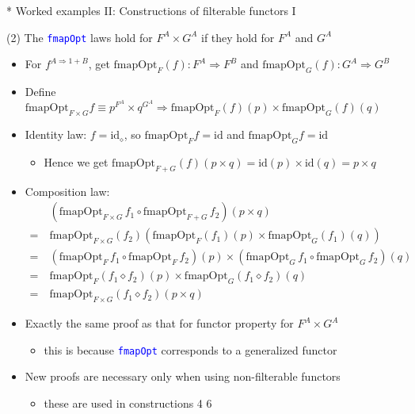 \documentclass[english]{beamer}
\begin{document}
\begin{frame}{{*} Worked examples II: Constructions of filterable functors I}

(2) The \texttt{\textcolor{blue}{\footnotesize{}fmapOpt}} laws hold
for $F^{A}\times G^{A}$ if they hold for $F^{A}$ and $G^{A}$
\begin{itemize}
\item For $f^{A\Rightarrow1+B}$, get {\footnotesize{}$\text{fmapOpt}_{F}(f):F^{A}\Rightarrow F^{B}$
}and {\footnotesize{}$\text{fmapOpt}_{G}(f):G^{A}\Rightarrow G^{B}$}{\footnotesize \par}
\item Define {\footnotesize{}$\text{fmapOpt}_{F\times G}f\equiv p^{F^{A}}\times q^{G^{A}}\Rightarrow\text{fmapOpt}_{F}(f)(p)\times\text{fmapOpt}_{G}(f)(q)$}{\footnotesize \par}
\item Identity law: $f=\text{id}_{\diamond}$, so {\footnotesize{}$\text{fmapOpt}_{F}f=\text{id}$}
and {\footnotesize{}$\text{fmapOpt}_{G}f=\text{id}$}{\footnotesize \par}
\begin{itemize}
\item Hence we get $\text{fmapOpt}_{F+G}(f)(p\times q)=\text{id}(p)\times\text{id}(q)=p\times q$
\end{itemize}
\item Composition law:{\footnotesize{}
\begin{align*}
 & (\text{fmapOpt}_{F\times G}\,f_{1}\circ\text{fmapOpt}_{F+G}\,f_{2})(p\times q)\\
=\  & \text{fmapOpt}_{F\times G}(f_{2})\left(\text{fmapOpt}_{F}(f_{1})(p)\times\text{fmapOpt}_{G}(f_{1})(q)\right)\\
=\  & (\text{fmapOpt}_{F}\,f_{1}\circ\text{fmapOpt}_{F}\,f_{2})(p)\times\left(\text{fmapOpt}_{G}\,f_{1}\circ\text{fmapOpt}_{G}\,f_{2}\right)(q)\\
=\  & \text{fmapOpt}_{F}(f_{1}\diamond f_{2})(p)\times\text{fmapOpt}_{G}(f_{1}\diamond f_{2})(q)\\
=\  & \text{fmapOpt}_{F\times G}(f_{1}\diamond f_{2})(p\times q)
\end{align*}
}{\footnotesize \par}
\item Exactly the same proof as that for functor property for $F^{A}\times G^{A}$
\begin{itemize}
\item this is because \texttt{\textcolor{blue}{\footnotesize{}fmapOpt}}
corresponds to a generalized functor
\end{itemize}
\item New proofs are necessary only when using non-filterable functors
\begin{itemize}
\item these are used in constructions 4 \textendash{} 6
\end{itemize}
\end{itemize}
\end{frame}
\end{document}
